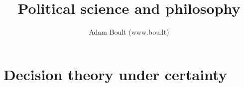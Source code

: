\documentclass[oneside]{book}
\begin{document}
\author{Adam Boult (www.bou.lt)}
\title{Political science and philosophy}
\maketitle

\setcounter{tocdepth}{0}
\tableofcontents



\part{Decision theory under certainty}

\end{document}
